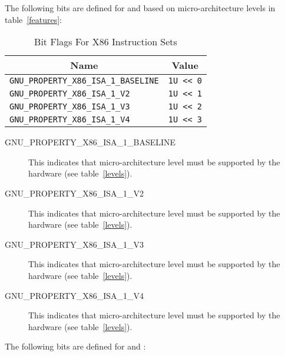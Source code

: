 The following bits are defined for 
and  based on micro-architecture levels
in table~\ref{features}:

\begin{table}[H]
\Hrule
  \caption{Bit Flags For X86 Instruction Sets}
  \begin{center}
    \begin{tabular}[t]{l|l}
      \multicolumn{1}{c}{Name} & \multicolumn{1}{c}{Value} \\
      \hline
     \texttt{GNU_PROPERTY_X86_ISA_1_BASELINE} & \texttt{1U << 0} \\
     \texttt{GNU_PROPERTY_X86_ISA_1_V2} & \texttt{1U << 1} \\
     \texttt{GNU_PROPERTY_X86_ISA_1_V3} & \texttt{1U << 2} \\
     \texttt{GNU_PROPERTY_X86_ISA_1_V4} & \texttt{1U << 3} \\
    \cline{1-2}
    \end{tabular}
  \end{center}
\end{table}

\begin{description}
 \item[GNU_PROPERTY_X86_ISA_1_BASELINE] This indicates that 
   micro-architecture level must be supported by the hardware
   (see table~\ref{levels}).
 \item[GNU_PROPERTY_X86_ISA_1_V2] This indicates that micro-architecture
   level  must be supported by the hardware
   (see table~\ref{levels}).
 \item[GNU_PROPERTY_X86_ISA_1_V3] This indicates that micro-architecture
   level  must be supported by the hardware
   (see table~\ref{levels}).
 \item[GNU_PROPERTY_X86_ISA_1_V4] This indicates that micro-architecture
   level  must be supported by the hardware
   (see table~\ref{levels}).
\end{description}

The following bits are defined for 
and :

